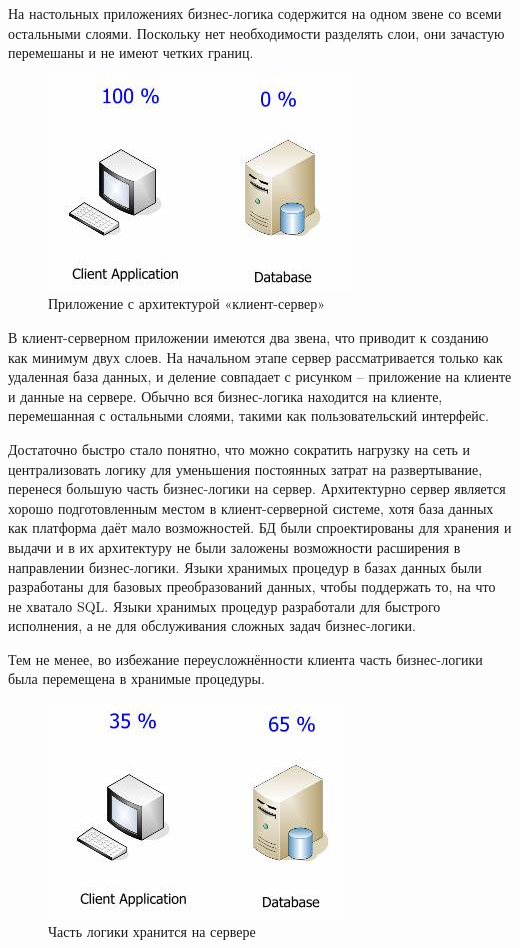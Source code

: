\documentclass[a4paper, 14pt]{extarticle}
\begin{document}
На настольных приложениях бизнес-логика содержится на одном звене со всеми остальными слоями. Поскольку нет необходимости разделять слои, они зачастую перемешаны и не имеют четких границ.

\begin{figure}[!htb]
  \centering
    \includegraphics[scale=0.6]{../shared_images/business-logic/client-server.jpg}
   \caption{Приложение с архитектурой «клиент-сервер»}
    \label{fig:start}
\end{figure}


В клиент-серверном приложении имеются два звена, что приводит к созданию как минимум двух слоев. На начальном этапе сервер рассматривается только как удаленная база данных, и деление совпадает с рисунком -- приложение на клиенте и данные на сервере. Обычно вся бизнес-логика находится на клиенте, перемешанная с остальными слоями, такими как пользовательский интерфейс.

Достаточно быстро стало понятно, что можно сократить нагрузку на сеть и централизовать логику для уменьшения постоянных затрат на развертывание, перенеся большую часть бизнес-логики на сервер. Архитектурно сервер является хорошо подготовленным местом в клиент-серверной системе, хотя база данных как платформа даёт мало возможностей. БД были спроектированы для хранения и выдачи и в их архитектуру не были заложены возможности расширения в направлении бизнес-логики. Языки хранимых процедур в базах данных были разработаны для базовых преобразований данных, чтобы поддержать то, на что не хватало SQL. Языки хранимых процедур разработали для быстрого исполнения, а не для обслуживания сложных задач бизнес-логики.

Тем не менее, во избежание переусложнённости клиента часть бизнес-логики была перемещена в хранимые процедуры.

\begin{figure}[!htb]
  \centering
    \includegraphics[scale=0.6]{../shared_images/business-logic/client-server-2.jpg}
   \caption{Часть логики хранится на сервере}
    \label{fig:start}
\end{figure}
\end{document}
